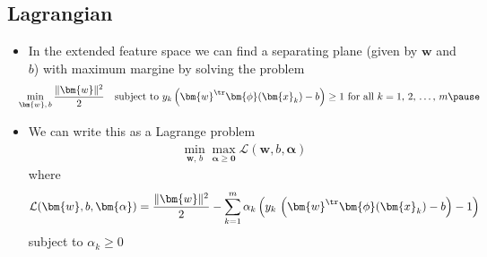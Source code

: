 
\begin{slide}
\section[-2]{Lagrangian}

\begin{PauseHighLight}
  \begin{itemize}
  \item In the extended feature space we can find a separating
    plane (given by $\bm{w}$ and $b$) with maximum margine by solving
    the problem
   \begin{align*}
     \hspace*{-1em} \min_{\bm{w},\,b} \frac{\|\bm{w}\|^2}{2} \quad 
     \mbox{subject to $y_k\left(\bm{w}^{\tr} \bm{\phi}(\bm{x}_k) -
     b\right) \geq 1$ for all $k=1,\,2,\,\ldots,\,m$}\pause
    \end{align*}
  \item We can write this as a Lagrange problem
    \begin{align*}
      \min_{\bm{w},\,b} \max_{\bm{\alpha}\geq\bm{0}} \mathcal{L}(\bm{w},b,\bm{\alpha})
    \end{align*}
    where
    \begin{align*}
      \mathcal{L}(\bm{w},b,\bm{\alpha}) = \frac{\|\bm{w}\|^2}{2}
      - \sum_{k=1}^m \alpha_k \left(y_k\,\left(\bm{w}^{\tr} \bm{\phi}(\bm{x}_k) -
     b\right) - 1\right)
    \end{align*}
    subject to $\alpha_k \geq 0$\pause
  \end{itemize}
\end{PauseHighLight}


\end{slide}




